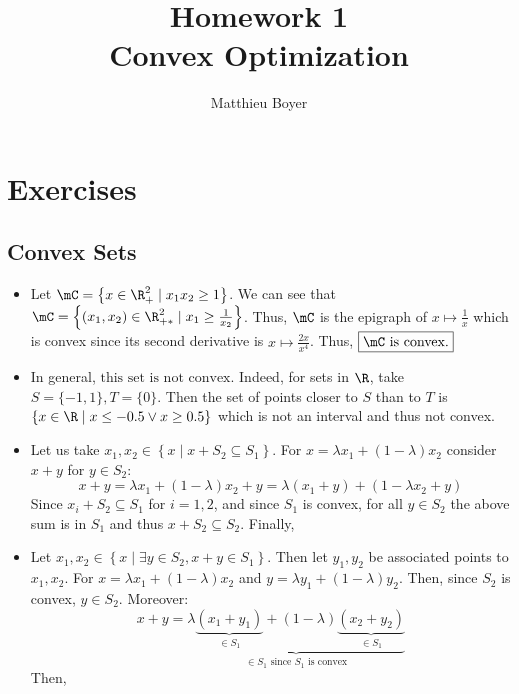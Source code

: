 \documentclass[math, info]{cours}
\title{Homework 1\\[-5pt] {\small Convex Optimization}}
\author{Matthieu Boyer}
\begin{document}
\maketitle

\section{Exercises}
\subsection*{Convex Sets}
\begin{itemize}
	\item Let $\mC = \left\{ x \in \R_{+}^{2} \mid x_{1}x_{2} \geq 1 \right\}$.
		We can see that $\mC = \left\{ (x_{1}, x_{2}) \in \R_{+*}^{2} \mid x_{1} \geq \frac{1}{x_{2}} \right\}$.
		Thus, $\mC$ is the epigraph of $x \mapsto \frac{1}{x}$ which is convex since its second derivative is $x \mapsto \frac{2x}{x^{4}}$.
		Thus, $\boxed{\mC \text{ is convex.}}$
	\item In general, $\boxed{\text{this set is not convex.}}$ Indeed, for sets in $\R$, take $S = \{-1, 1\}, T = \{0\}$.
		Then the set of points closer to $S$ than to $T$ is $\{x \in \R \mid x\leq -0.5 \lor x \geq 0.5\}$ which is not an interval and thus not convex.
			\item Let us take $x_{1}, x_{2} \in \left\{ x \mid x + S_{2} \subseteq S_{1} \right\}$.
		For $x = \lambda x_{1} + \left( 1 - \lambda \right)x_{2}$ consider $x + y$ for $y \in S_{2}$:
		\begin{equation*}
			x + y = \lambda x_{1} + \left(1 - \lambda \right)x_{2} + y = \lambda(x_{1} + y) + (1 - \lambda x_{2} + y)
		\end{equation*}
		Since $x_{i} + S_{2}\subseteq S_{1}$ for $i = 1, 2$, and since $S_{1}$ is convex, for all $y \in S_{2}$ the above sum is in $S_{1}$ and thus $x + S_{2} \subseteq S_{2}$.
		Finally, 
	\item Let $x_{1}, x_{2} \in \left\{ x \mid \exists y \in S_{2}, x + y \in S_{1} \right\}$.
		Then let $y_{1}, y_{2}$ be associated points to $x_{1}, x_{2}$.
		For $x = \lambda x_{1} + \left( 1 - \lambda \right)x_{2}$ and $y = \lambda y_{1} + (1 - \lambda) y_{2}$.
		Then, since $S_{2}$ is convex, $y \in S_{2}$.
		Moreover:
		\begin{equation*}
			x + y = \underbrace{\lambda \underbrace{(x_{1} + y_{1})}_{\in S_{1}} + \left( 1 - \lambda \right)\underbrace{(x_{2} + y_{2})}_{\in S_{1}}}_{\in S_{1} \text{ since } S_{1} \text{ is convex}}
		\end{equation*}
		Then, 
\end{itemize}
\end{document}
